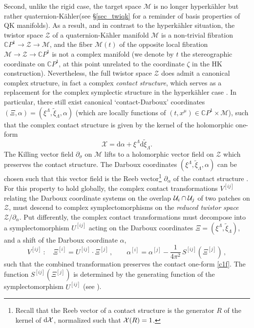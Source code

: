 \documentclass[12pt,reqno]{article}
\numberwithin{equation}{section}
\newcommand{\be}{\begin{equation}}
\newcommand{\ee}{\end{equation}}
\def\CX {{\cal X}}
\def\hcU{{\cal U}}
\newcommand{\CP}{\IC P^1}
\newcommand{\de}{\mathrm{d}}
\newcommand{\cM}{\mathcal{M}}
\newcommand{\cX}{\mathcal{X}}
\newcommand{\cZ}{\mathcal{Z}}
\newcommand{\IC}{\mathbb{C}}
\def\ui#1{^{[#1]}}
\def\pa{\partial}
\newcommand{\txi}{\tilde\xi}
\newcommand{\hk}{{hyperk\"ahler}\xspace}
\newcommand{\qk}{{quaternion-K\"ahler}\xspace}
\def\varpiqk{t}
\def\varpihk{\zeta}
\numberwithin{equation}{section}
\begin{document}
Second, unlike the rigid case, the target space $\cM$ is no longer
\hk but rather \qk (see \S\ref{sec_twiqk} for a reminder of basis properties
of QK manifolds).  As a result, and in contrast to the hyperk\"ahler situation,
the twistor space $\cZ$ of a quaternion-K\"ahler
manifold $\cM$ is a non-trivial
fibration $\CP\to \cZ \to \cM$, and the fiber $\cM(\varpiqk)$ of the
opposite local fibration $\cM \to \cZ \to \CP$  is not a complex
manifold (we denote by $\varpiqk$ the stereographic coordinate on $\CP$,
at this point unrelated to the coordinate $\varpihk$ in the HK construction).
Nevertheless, the full twistor space $\cZ$ does admit a
canonical complex structure, in fact a complex {\it contact structure},
which serves as a replacement for the complex symplectic structure
in the \hk case \cite{MR664330}. In particular, there still exist
canonical `contact-Darboux' coordinates $(\Xi, \alpha)=(\xi^\Lambda,\txi_\Lambda,\alpha)$
(which are locally functions of $(\varpiqk,x^\mu)\in \CP\times \cM$),
such that the complex contact structure is given by the kernel of the holomorphic one-form
\cite{Alexandrov:2008nk}
\be
\label{c1f}
\cX=\de\alpha+\xi^\Lambda\de\txi_\Lambda.
\ee
The Killing vector field $\pa_\sigma$ on $\cM$ lifts to a holomorphic vector field on $\cZ$
which preserves the contact structure. The Darboux coordinates
$(\xi^{\Lambda}, \tilde\xi_\Lambda, \alpha)$ can be chosen such that
this vector field is  the Reeb vector\footnote{Recall that the Reeb vector of a contact structure
is the generator $R$ of the kernel of $\de\CX$, normalized such that $\CX(R)=1$.}
$\partial_\alpha$ of the contact structure \cite{Neitzke:2007ke}. For this property to hold
globally, the complex contact transformations $V\ui{ij}$ relating
the Darboux coordinate systems on the overlap
$\hcU_i\cap \hcU_j$ of two patches on $\cZ$, must descend to
complex symplectomorphisms on the {\it reduced twistor space}
$\cZ/\partial_\alpha$. Put differently, the  complex contact transformations  must
decompose into a symplectomorphism $U\ui{ij}$ acting on the Darboux coordinates
$\Xi=(\xi^\Lambda,\txi_\Lambda)$, and a shift of the Darboux
coordinate $\alpha$,
\be
\label{cxi}
V\ui{ij}\ :\quad
\Xi\ui{i}=U\ui{ij}\cdot \Xi\ui{j}\, ,
\qquad
\alpha\ui{i}=\alpha\ui{j}-\frac{1}{4\pi^2}\, S\ui{ij}(\Xi\ui{j})\, ,
\ee
such that the combined transformation preserves the contact one-form \eqref{c1f}.
The function $S\ui{ij}(\Xi\ui{j})$ is determined by the generating
function
of the symplectomorphism $U\ui{ij}$ (see \cite{Alexandrov:2008ds,Alexandrov:2008nk}).
\end{document}
